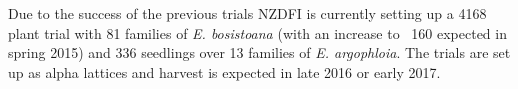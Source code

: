 Due to the success of the previous trials NZDFI is currently setting up a 4168
plant trial with 81 families of \textit{E. bosistoana} (with an increase to ~160
expected in spring 2015) and 336 seedlings over 13 families of \textit{E.
argophloia}. The trials are set up as alpha lattices and harvest is expected in
late 2016 or early 2017. 
